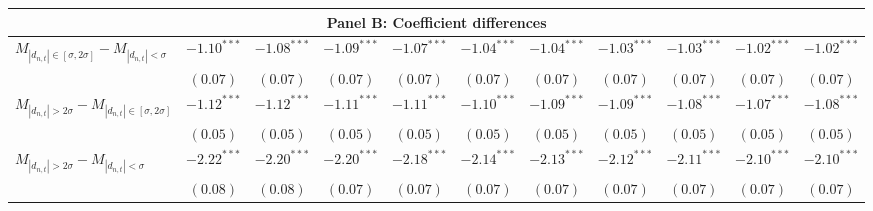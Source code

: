 \begin{tabular}{lcccccccccc}
   \hline \multicolumn{11}{c}{Panel B: Coefficient differences} \\
 \hline$M_{|d_{n,t}| \in [\sigma, 2\sigma]} - M_{|d_{n,t}| < \sigma}$ & $-1.10^{***}$ & $-1.08^{***}$ & $-1.09^{***}$ & $-1.07^{***}$ & $-1.04^{***}$ & $-1.04^{***}$ & $-1.03^{***}$ & $-1.03^{***}$ & $-1.02^{***}$ & $-1.02^{***}$ \\ 
   & $(0.07)$ & $(0.07)$ & $(0.07)$ & $(0.07)$ & $(0.07)$ & $(0.07)$ & $(0.07)$ & $(0.07)$ & $(0.07)$ & $(0.07)$ \\ 
  $M_{|d_{n,t}| > 2 \sigma} - M_{|d_{n,t}| \in [\sigma, 2\sigma]}$ & $-1.12^{***}$ & $-1.12^{***}$ & $-1.11^{***}$ & $-1.11^{***}$ & $-1.10^{***}$ & $-1.09^{***}$ & $-1.09^{***}$ & $-1.08^{***}$ & $-1.07^{***}$ & $-1.08^{***}$ \\ 
   & $(0.05)$ & $(0.05)$ & $(0.05)$ & $(0.05)$ & $(0.05)$ & $(0.05)$ & $(0.05)$ & $(0.05)$ & $(0.05)$ & $(0.05)$ \\ 
  $M_{|d_{n,t}| > 2 \sigma} - M_{|d_{n,t}| < \sigma}$ & $-2.22^{***}$ & $-2.20^{***}$ & $-2.20^{***}$ & $-2.18^{***}$ & $-2.14^{***}$ & $-2.13^{***}$ & $-2.12^{***}$ & $-2.11^{***}$ & $-2.10^{***}$ & $-2.10^{***}$ \\ 
   & $(0.08)$ & $(0.08)$ & $(0.07)$ & $(0.07)$ & $(0.07)$ & $(0.07)$ & $(0.07)$ & $(0.07)$ & $(0.07)$ & $(0.07)$ \\ 
   \hline 
\end{tabular}
